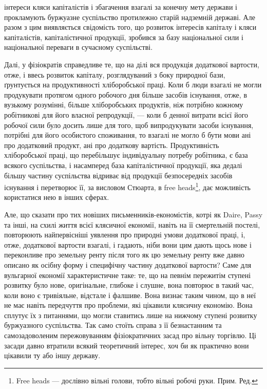 \parcont{}  %
інтереси кляси капіталістів і збагачення взагалі за конечну мету держави і прокламують
буржуазне суспільство протилежно старій надземній державі. Але разом
з цим виявляється свідомість того, що розвиток інтересів капіталу і кляси капіталістів,
капіталістичної продукції, зробився за базу національної сили і національної
переваги в сучасному суспільстві.

Далі, у фізіократів справедливе те, що на ділі вся продукція додаткової вартости,
отже, і ввесь розвиток капіталу, розглядуваний з боку природної бази,
ґрунтується на продуктивності хліборобської праці. Коли б люди взагалі не могли
продукувати протягом одного робочого дня більше засобів існування, отже, в вузькому
розумінні, більше хліборобських продуктів, ніж потрібно кожному робітникові
для його власної репродукції, — коли б денної витрати всієї його робочої сили
було досить лише для того, щоб випродукувати засоби існування, потрібні для
його особистого споживання, то взагалі не могло б бути мови ані про додатковий
продукт, ані про додаткову вартість. Продуктивність хліборобської праці, що
перебільшує індивідуальну потребу робітника, є база всякого суспільства, і насамперед
база капіталістичної продукції, яка дедалі більшу частину суспільства
відриває від продукції безпосередніх засобів існування і перетворює її, за висловом
Стюарта, в free heads\footnote*{
Free heads — дослівно вільні голови, тобто вільні робочі руки. Прим. Ред.
}, дає можливість користатися нею в інших сферах.

Але, що сказати про тих новіших письменників-економістів, котрі як
Daire, Passy та інші, на схилі життя всієї клясичної економії, навіть на її смертельній
постелі, повторюють найпервісніші уявлення про природні умови додаткової
праці, і, отже, додаткової вартости взагалі, і гадають, ніби вони цим дають
щось нове і переконливе про земельну ренту після того як цю земельну ренту
вже давно описано як осібну форму і специфічну частину додаткової вартости?
Саме для вульгарної економії характеристичне таке: те, що на певнім пережитім ступені
розвитку було нове, оригінальне, глибоке і слушне, вона повторює в
такий час, коли воно є тривіяльне, відстале і фалшиве. Вона визнає таким
чином, що в неї не має навіть передчуття про проблеми, які цікавили клясичну
економію. Вона сплутує їх з питаннями, що могли ставитись лише на нижчому
ступені розвитку буржуазного суспільства. Так само стоїть справа з її безнастанним
та самозадоволеним пережовуванням фізіократичних засад про вільну
торгівлю. Ці засади давно втратили всякий теоретичний інтерес, хоч би як
практично вони цікавили ту або іншу державу.

